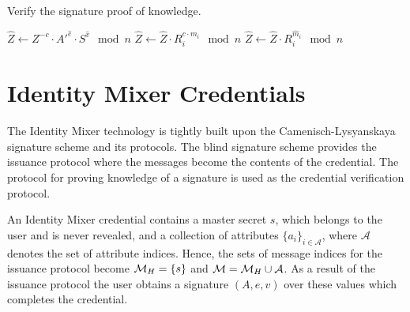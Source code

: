 \begin{algorithm}[t]
  \caption{Verify the signature proof of knowledge.}
  \label{alg:CL-verify-D}
  \addtolength{\baselineskip}{1.5mm}

  \begin{algorithmic}[1]
      \State $\hat{Z} \gets Z^{-c} \cdot A'^{\hat{e}} \cdot S^{\hat{v}} \mod n$
        \State $\hat{Z} \gets \hat{Z} \cdot R_i^{c \cdot m_i} \mod n$
      \EndFor
        \State $\hat{Z} \gets \hat{Z} \cdot R_i^{\hat{m}_i} \mod n$
      \EndFor

        \Return {}
      \EndIf
      \Return {}
    \EndFunction
  \end{algorithmic}
\end{algorithm}

\section{Identity Mixer Credentials}

The Identity Mixer technology is tightly built upon the Camenisch-Lysyanskaya
signature scheme and its protocols. The blind signature scheme provides the
issuance protocol where the messages become the contents of the credential. The
protocol for proving knowledge of a signature is used as the credential
verification protocol.

An Identity Mixer credential contains a master secret $s$, which belongs to the
user and is never revealed, and a collection of attributes
$\{a_i\}_{i \in \mathcal{A}}$, where $\mathcal{A}$ denotes the set of
attribute indices. Hence, the sets of message indices for the issuance protocol
become $\mathcal{M}_H = \{s\}$ and $\mathcal{M} = \mathcal{M}_H \cup \mathcal{A}$. As a result of the
issuance protocol the user obtains a signature $(A, e, v)$ over these values
which completes the credential.

